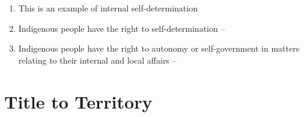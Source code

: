 \begin{enumerate}
\begin{enumerate}
\begin{enumerate}
            \item This is an example of internal self-determination
            \item Indigenous people have the right to self-determination -- 
            \item Indigenous people have the right to autonomy or self-government in matters relating to their internal and local affairs -- 
        \end{enumerate} 
    \end{enumerate}
\end{enumerate}

\section{Title to Territory}
